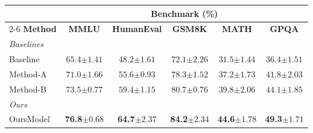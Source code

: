 \documentclass[10pt]{article}
\begin{document}
\centering
\begin{tabular}{lccccc}
\toprule
\multicolumn{1}{c}{} & \multicolumn{5}{c}{\textbf{Benchmark (\%)}} \\
\cmidrule(lr){2-6}
\textbf{Method} & \textbf{MMLU} & \textbf{HumanEval} & \textbf{GSM8K} & \textbf{MATH} & \textbf{GPQA} \\
\midrule
\multicolumn{6}{l}{\textit{Baselines}} \\
Baseline & $65.4{\pm 1.41}$ & $48.2{\pm 1.61}$ & $72.1{\pm 2.26}$ & $31.5{\pm 1.44}$ & $36.4{\pm 1.51}$ \\
Method-A & $71.0{\pm 1.66}$ & $55.6{\pm 0.93}$ & $78.3{\pm 1.52}$ & $37.2{\pm 1.73}$ & $41.8{\pm 2.03}$ \\
Method-B & $73.5{\pm 0.77}$ & $59.4{\pm 1.15}$ & $80.7{\pm 0.76}$ & $39.8{\pm 2.06}$ & $44.1{\pm 1.85}$ \\
\midrule
\multicolumn{6}{l}{\textit{Ours}} \\
\rowcolor{oursbg}OursModel & \textbf{76.8}${\pm 0.68}$ & \textbf{64.7}${\pm 2.37}$ & \textbf{84.2}${\pm 2.34}$ & \textbf{44.6}${\pm 1.78}$ & \textbf{49.3}${\pm 1.71}$ \\
\bottomrule
\end{tabular}
\end{document}
